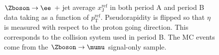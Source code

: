 \documentclass[NOTE, atlasdraft=true, texlive=2016, USenglish]{\ATLASLATEXPATH atlasdoc}
\begin{document}
\begin{figure}[htbp]
{		\label{fig:xjzee4PABSO}
	}
	\caption{$\Zboson\rightarrow\ee$ + jet average $x_{\text{J}}^{\text{ref}}$ in both period A and period B data taking as a function of $p_{\text{T}}^{\text{ref}}$. Pseudorapidity is flipped so that $\eta$ is measured with respect to the proton going direction. This corresponds to the collision system used in period B. The MC events come from the $\Zboson\rightarrow\mumu$ signal-only sample.}
	\label{fig:xjzeePABSO}
\end{figure}
\end{document}
